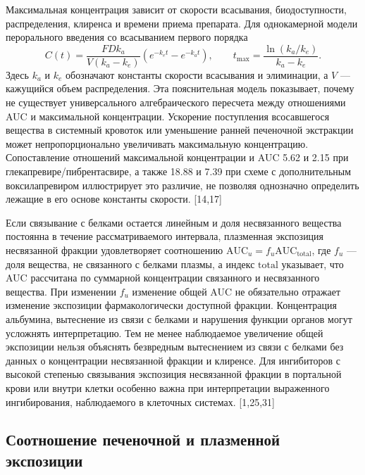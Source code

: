 \documentclass[11pt]{article}
\begin{document}
Максимальная концентрация зависит от скорости всасывания, биодоступности, распределения, клиренса и времени приема препарата. Для однокамерной модели перорального введения со всасыванием первого порядка
\[
C(t)=\frac{F D k_a}{V(k_a-k_e)}
\left(e^{-k_e t}-e^{-k_a t}\right),
\qquad
t_{\max}=\frac{\ln(k_a/k_e)}{k_a-k_e}.
\]
Здесь \(k_a\) и \(k_e\) обозначают константы скорости всасывания и элиминации, а \(V\) --- кажущийся объем распределения. Эта пояснительная модель показывает, почему не существует универсального алгебраического пересчета между отношениями AUC и максимальной концентрации. Ускорение поступления всосавшегося вещества в системный кровоток или уменьшение ранней печеночной экстракции может непропорционально увеличивать максимальную концентрацию. Сопоставление отношений максимальной концентрации и AUC 5.62 и 2.15 при глекапревире/пибрентасвире, а также 18.88 и 7.39 при схеме с дополнительным воксилапревиром иллюстрирует это различие, не позволяя однозначно определить лежащие в его основе константы скорости. [14,17]

Если связывание с белками остается линейным и доля несвязанного вещества постоянна в течение рассматриваемого интервала, плазменная экспозиция несвязанной фракции удовлетворяет соотношению \(\mathrm{AUC}_u=f_u\mathrm{AUC}_{\mathrm{total}}\), где \(f_u\) --- доля вещества, не связанного с белками плазмы, а индекс \(\mathrm{total}\) указывает, что AUC рассчитана по суммарной концентрации связанного и несвязанного вещества. При изменении \(f_u\) изменение общей AUC не обязательно отражает изменение экспозиции фармакологически доступной фракции. Концентрация альбумина, вытеснение из связи с белками и нарушения функции органов могут усложнять интерпретацию. Тем не менее наблюдаемое увеличение общей экспозиции нельзя объяснять безвредным вытеснением из связи с белками без данных о концентрации несвязанной фракции и клиренсе. Для ингибиторов с высокой степенью связывания экспозиция несвязанной фракции в портальной крови или внутри клетки особенно важна при интерпретации выраженного ингибирования, наблюдаемого в клеточных системах. [1,25,31]

\subsection{Соотношение печеночной и плазменной экспозиции}
\end{document}
